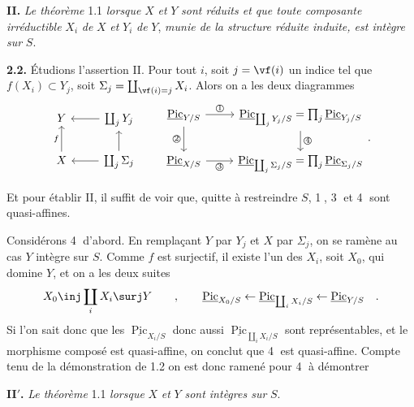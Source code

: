 \smallskip
\noindent\textbf{II.} \textit{Le théorème} 1.1 \textit{lorsque} $X$ \textit{et} $Y$ \textit{sont réduits et que toute composante irréductible} $X_i$ \textit{de} $X$ \textit{et} $Y_i$ \textit{de} $Y$, \textit{munie de la structure réduite induite, est intègre sur} $S$.

\noindent\textbf{2.2.} Étudions l'assertion II. Pour tout $i$, soit $j = \vf(i)$ un indice tel que $f(X_i) \subset Y_j$, soit $\Sigma_j = \coprod_{\vf(i)=j} X_i$. Alors on a les deux diagrammes
\[
\begin{tikzcd}
Y & \coprod_j Y_j \arrow[l] \\
X \arrow[u, "f"] & \coprod_j \Sigma_j \arrow[l] \arrow[u]
\end{tikzcd}
\qquad
\begin{tikzcd}
\underline{\operatorname{Pic}}_{Y/S} \arrow[r, "\text{\textcircled{1}}"] \arrow[d, "\text{\textcircled{2}}"'] & \underline{\operatorname{Pic}}_{\coprod_j Y_j/S} = \prod_j \underline{\operatorname{Pic}}_{Y_j/S} \arrow[d, "\text{\textcircled{4}}"] \\
\underline{\operatorname{Pic}}_{X/S} \arrow[r, "\text{\textcircled{3}}"'] & \underline{\operatorname{Pic}}_{\coprod_j \Sigma_j/S} = \prod_j \underline{\operatorname{Pic}}_{\Sigma_j/S}
\end{tikzcd}.
\]

\noindent
Et pour établir II, il suffit de voir que, quitte à restreindre $S$, \textcircled{1}, \textcircled{3} et \textcircled{4} sont quasi-affines.

Considérons \textcircled{4} d'abord. En remplaçant $Y$ par $Y_j$ et $X$ par $\Sigma_j$, on se ramène au cas $Y$ intègre sur $S$. Comme $f$ est surjectif, il existe l'un des $X_i$, soit $X_0$, qui domine $Y$, et on a les deux suites
\[
X_0 \inj \coprod_i X_i \surj Y \qquad , \qquad
\underline{\operatorname{Pic}}_{X_0/S} \leftarrow \underline{\operatorname{Pic}}_{\coprod_i X_i/S} \leftarrow \underline{\operatorname{Pic}}_{Y/S} \quad .
\]
Si l'on sait donc que les $\underline{\operatorname{Pic}}_{X_i/S}$ donc aussi $\underline{\operatorname{Pic}}_{\coprod_i X_i/S}$ sont représentables, et le morphisme composé est quasi-affine, on conclut que \textcircled{4} est quasi-affine. Compte tenu de la démonstration de 1.2 on est donc ramené pour \textcircled{4} à démontrer

\smallskip
\noindent\textbf{II$'$.} \textit{Le théorème} 1.1 \textit{lorsque} $X$ \textit{et} $Y$ \textit{sont intègres sur} $S$.

